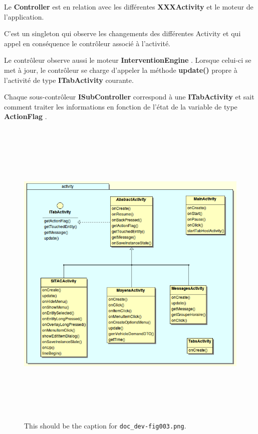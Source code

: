 \documentclass{article}
\begin{document}
\vspace{13pt}
\parindent=0pt
{\color{color01} Le }{\color{color01} \textbf{Controller}}{\color{color01}  est 
en relation avec les différentes }{\color{color01} \textbf{XXXActivity}}{\color{color01}  
et le moteur de l'application.}

{\color{color01} C'est un singleton qui observe les changements des différentes 
Activity et qui appel en conséquence le contrôleur associé à l'activité.}

{\color{color01} Le contrôleur observe aussi le moteur }{\color{color01} \textbf{InterventionEngine}}{\color{color01} . 
Lorsque celui-ci se met à jour, le contrôleur se charge d'appeler la méthode 
}{\color{color01} \textbf{update()}}{\color{color01}  propre à l'activité de 
type }{\color{color01} \textbf{ITabActivity }}{\color{color01} courante.}

{\color{color01} Chaque sous-contrôleur }{\color{color01} \textbf{ISubController}}{\color{color01}  
correspond à une }{\color{color01} \textbf{ITabActivity}}{\color{color01}  et 
sait comment traiter les informations en fonction de l'état de la variable de 
type }{\color{color01} \textbf{ActionFlag}}{\color{color01} .}

\begin{figure}[htbp]
\begin{center}
\includegraphics[width=499pt, height=433pt]{doc_dev-fig003.png}
\caption{This should be the caption for \texttt{doc\_dev-fig003.png}.}
\end{center}
\end{figure}
\end{document}
